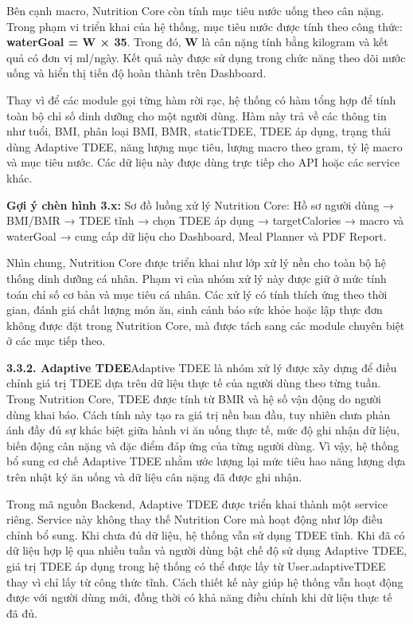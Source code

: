 Bên cạnh macro, Nutrition Core còn tính mục tiêu nước uống theo cân nặng. Trong phạm vi triển khai của hệ thống, mục tiêu nước được tính theo công thức: \textbf{waterGoal = W × 35}. Trong đó, \textbf{W} là cân nặng tính bằng kilogram và kết quả có đơn vị ml/ngày. Kết quả này được sử dụng trong chức năng theo dõi nước uống và hiển thị tiến độ hoàn thành trên Dashboard.

Thay vì để các module gọi từng hàm rời rạc, hệ thống có hàm tổng hợp để tính toàn bộ chỉ số dinh dưỡng cho một người dùng. Hàm này trả về các thông tin như tuổi, BMI, phân loại BMI, BMR, staticTDEE, TDEE áp dụng, trạng thái dùng Adaptive TDEE, năng lượng mục tiêu, lượng macro theo gram, tỷ lệ macro và mục tiêu nước. Các dữ liệu này được dùng trực tiếp cho API hoặc các service khác.

\textbf{Gợi ý chèn hình 3.x:} Sơ đồ luồng xử lý Nutrition Core: Hồ sơ người dùng → BMI/BMR → TDEE tĩnh → chọn TDEE áp dụng → targetCalories → macro và waterGoal → cung cấp dữ liệu cho Dashboard, Meal Planner và PDF Report.

Nhìn chung, Nutrition Core được triển khai như lớp xử lý nền cho toàn bộ hệ thống dinh dưỡng cá nhân. Phạm vi của nhóm xử lý này được giữ ở mức tính toán chỉ số cơ bản và mục tiêu cá nhân. Các xử lý có tính thích ứng theo thời gian, đánh giá chất lượng món ăn, sinh cảnh báo sức khỏe hoặc lập thực đơn không được đặt trong Nutrition Core, mà được tách sang các module chuyên biệt ở các mục tiếp theo.

\textbf{3.3.2. Adaptive TDEE}Adaptive TDEE là nhóm xử lý được xây dựng để điều chỉnh giá trị TDEE dựa trên dữ liệu thực tế của người dùng theo từng tuần. Trong Nutrition Core, TDEE được tính từ BMR và hệ số vận động do người dùng khai báo. Cách tính này tạo ra giá trị nền ban đầu, tuy nhiên chưa phản ánh đầy đủ sự khác biệt giữa hành vi ăn uống thực tế, mức độ ghi nhận dữ liệu, biến động cân nặng và đặc điểm đáp ứng của từng người dùng. Vì vậy, hệ thống bổ sung cơ chế Adaptive TDEE nhằm ước lượng lại mức tiêu hao năng lượng dựa trên nhật ký ăn uống và dữ liệu cân nặng đã được ghi nhận.

Trong mã nguồn Backend, Adaptive TDEE được triển khai thành một service riêng. Service này không thay thế Nutrition Core mà hoạt động như lớp điều chỉnh bổ sung. Khi chưa đủ dữ liệu, hệ thống vẫn sử dụng TDEE tĩnh. Khi đã có dữ liệu hợp lệ qua nhiều tuần và người dùng bật chế độ sử dụng Adaptive TDEE, giá trị TDEE áp dụng trong hệ thống có thể được lấy từ User.adaptiveTDEE thay vì chỉ lấy từ công thức tĩnh. Cách thiết kế này giúp hệ thống vẫn hoạt động được với người dùng mới, đồng thời có khả năng điều chỉnh khi dữ liệu thực tế đã đủ.

